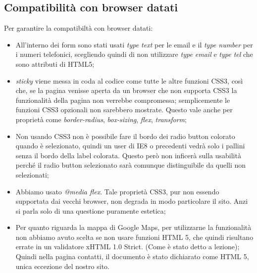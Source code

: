 \subsection{Compatibilità con browser datati}
Per garantire la compatibiltà con browser datati:
\begin{itemize}
\item All’interno dei form sono stati usati \textit{type text} per le email e il \textit{type number} per i numeri telefonici, scegliendo quindi di non utilizzare \textit{type email} e \textit{type tel} che sono attributi di HTML5;
\item \textit{sticky} viene messa in coda al codice come tutte le altre funzioni CSS3,  così che, se la pagina venisse aperta da un browser che non supporta CSS3 la funzionalità della pagina non verrebbe compromessa; semplicemente le funzioni CSS3 opzionali non sarebbero mostrate. Questo vale anche per proprietà come \textit{border-radius}, \textit{box-sizing}, \textit{flex}, \textit{transform};
\item Non usando CSS3 non è possibile fare il bordo dei radio button colorato quando è selezionato, quindi un user di IE8 o precedenti vedrà solo i pallini senza il bordo della label colorata. Questo però non inficerà sulla usabilità perché il radio button selezionato sarà comunque distinguibile da quelli non selezionati;
\item Abbiamo usato \textit{@media flex}. Tale proprietà CSS3, pur non essendo supportata dai vecchi browser, non degrada in modo particolare il sito. Anzi si parla solo di una questione puramente estetica;
\item Per quanto riguarda la mappa di Google Maps, per utilizzarne la funzionalità non abbiamo avuto scelta se non usare funzioni HTML 5, che quindi risultano errate in un validatore xHTML 1.0 Strict. (Come è stato detto a lezione);
Quindi nella pagina contatti, il documento è stato dichiarato come HTML 5, unica eccezione del nostro sito.
\end{itemize}


